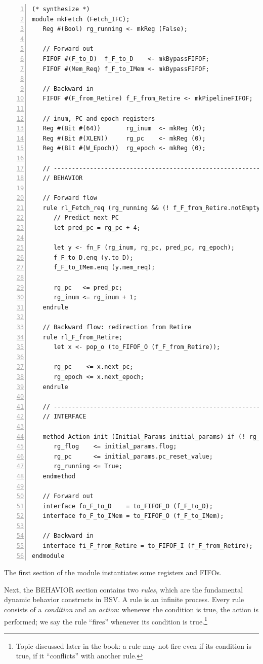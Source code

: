 {\small
\begin{Verbatim}[frame=single, numbers=left, label=(In file:src\_Fife/S1\_Fetch.bsv)]
(* synthesize *)
module mkFetch (Fetch_IFC);
   Reg #(Bool) rg_running <- mkReg (False);

   // Forward out
   FIFOF #(F_to_D)  f_F_to_D    <- mkBypassFIFOF;
   FIFOF #(Mem_Req) f_F_to_IMem <- mkBypassFIFOF;

   // Backward in
   FIFOF #(F_from_Retire) f_F_from_Retire <- mkPipelineFIFOF;

   // inum, PC and epoch registers
   Reg #(Bit #(64))       rg_inum  <- mkReg (0);
   Reg #(Bit #(XLEN))     rg_pc    <- mkReg (0);
   Reg #(Bit #(W_Epoch))  rg_epoch <- mkReg (0);

   // ----------------------------------------------------------------
   // BEHAVIOR

   // Forward flow
   rule rl_Fetch_req (rg_running && (! f_F_from_Retire.notEmpty));
      // Predict next PC
      let pred_pc = rg_pc + 4;

      let y <- fn_F (rg_inum, rg_pc, pred_pc, rg_epoch);
      f_F_to_D.enq (y.to_D);
      f_F_to_IMem.enq (y.mem_req);

      rg_pc   <= pred_pc;
      rg_inum <= rg_inum + 1;
   endrule

   // Backward flow: redirection from Retire
   rule rl_F_from_Retire;
      let x <- pop_o (to_FIFOF_O (f_F_from_Retire));

      rg_pc    <= x.next_pc;
      rg_epoch <= x.next_epoch;
   endrule

   // ----------------------------------------------------------------
   // INTERFACE

   method Action init (Initial_Params initial_params) if (! rg_running);
      rg_flog    <= initial_params.flog;
      rg_pc      <= initial_params.pc_reset_value;
      rg_running <= True;
   endmethod

   // Forward out
   interface fo_F_to_D    = to_FIFOF_O (f_F_to_D);
   interface fo_F_to_IMem = to_FIFOF_O (f_F_to_IMem);

   // Backward in
   interface fi_F_from_Retire = to_FIFOF_I (f_F_from_Retire);
endmodule
\end{Verbatim}
}

The first section of the module instantiates some registers and FIFOs.

Next, the BEHAVIOR section contains two \emph{rules}, which are the
fundamental dynamic behavior constructs in BSV.  A rule is an infinite
process.  Every rule consists of a \emph{condition} and an
\emph{action}: whenever the condition is true, the action is
performed; we say the rule ``fires'' whenever its condition is
true.\footnote{Topic discussed later in the book: a rule may not fire
even if its condition is true, if it ``conflicts'' with another rule.}

